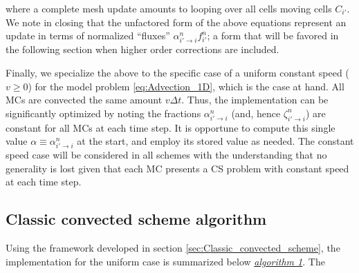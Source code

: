 \documentclass[11pt,titlepage]{report}
\begin{document}
\noindent where a complete mesh update amounts to looping over all cells moving cells $C_{i'}$. We note in closing that the unfactored form of the above equations represent an update in terms of normalized ``fluxes'' $\alpha_{i'\to i}^n f_{i'}^n$; a form that will be favored in the following section when higher order corrections are included.

Finally, we specialize the above to the specific case of a uniform constant speed ($v \geq 0$) for the model problem \eqref{eq:Advection_1D}, which is the case at hand. All MCs are convected the same amount $v\Delta t$. Thus, the implementation can be significantly optimized by noting the fractions $\alpha_{i'\to i}^n$ (and, hence $\zeta_{i'\to i}^n$) are constant for all MCs at each time step. It is opportune to compute this single value $\alpha \equiv \alpha_{i'\to i}^n$ at the start, and employ its stored value as needed. The constant speed case will be considered in all schemes with the understanding that no generality is lost given that each MC presents a CS problem with constant speed at each time step.

\subsection{Classic convected scheme algorithm}

 Using the framework developed in section \ref{sec:Classic_convected_scheme}, the implementation for the uniform case is summarized below \emph{\hyperlink{alg:1}{algorithm 1}}. The \\[0.3em]
\end{document}
